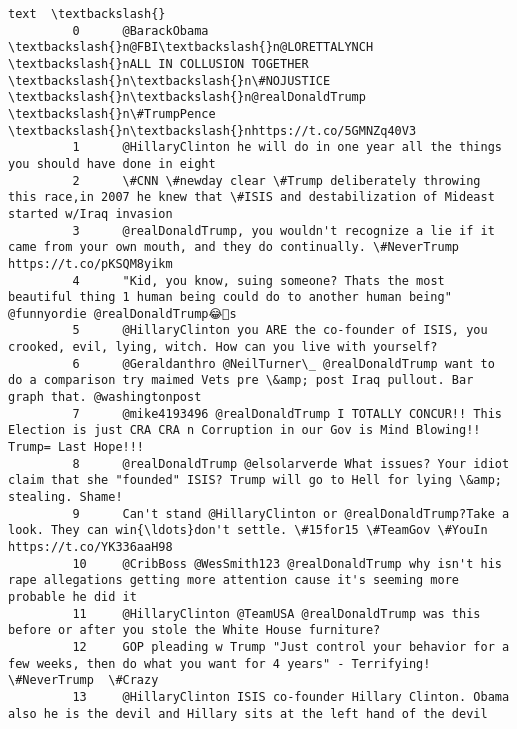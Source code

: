 \documentclass[11pt]{article}
\begin{document}
\begin{Verbatim}[commandchars=\\\{\}]
                                                                                                                                                                    text  \textbackslash{}
         0      @BarackObama \textbackslash{}n@FBI\textbackslash{}n@LORETTALYNCH \textbackslash{}nALL IN COLLUSION TOGETHER \textbackslash{}n\textbackslash{}n\#NOJUSTICE \textbackslash{}n\textbackslash{}n@realDonaldTrump \textbackslash{}n\#TrumpPence \textbackslash{}n\textbackslash{}nhttps://t.co/5GMNZq40V3               
         1      @HillaryClinton he will do in one year all the things you should have done in eight                                                                        
         2      \#CNN \#newday clear \#Trump deliberately throwing this race,in 2007 he knew that \#ISIS and destabilization of Mideast started w/Iraq invasion                
         3      @realDonaldTrump, you wouldn't recognize a lie if it came from your own mouth, and they do continually. \#NeverTrump https://t.co/pKSQM8yikm                
         4      "Kid, you know, suing someone? Thats the most beautiful thing 1 human being could do to another human being" @funnyordie @realDonaldTrump😂💩s               
         5      @HillaryClinton you ARE the co-founder of ISIS, you crooked, evil, lying, witch. How can you live with yourself?                                           
         6      @Geraldanthro @NeilTurner\_ @realDonaldTrump want to do a comparison try maimed Vets pre \&amp; post Iraq pullout. Bar graph that. @washingtonpost           
         7      @mike4193496 @realDonaldTrump I TOTALLY CONCUR!! This Election is just CRA CRA n Corruption in our Gov is Mind Blowing!! Trump= Last Hope!!!               
         8      @realDonaldTrump @elsolarverde What issues? Your idiot claim that she "founded" ISIS? Trump will go to Hell for lying \&amp; stealing. Shame!               
         9      Can't stand @HillaryClinton or @realDonaldTrump?Take a look. They can win{\ldots}don't settle. \#15for15 \#TeamGov \#YouIn  https://t.co/YK336aaH98                
         10     @CribBoss @WesSmith123 @realDonaldTrump why isn't his rape allegations getting more attention cause it's seeming more probable he did it                   
         11     @HillaryClinton @TeamUSA @realDonaldTrump was this before or after you stole the White House furniture?                                                    
         12     GOP pleading w Trump "Just control your behavior for a few weeks, then do what you want for 4 years" - Terrifying! \#NeverTrump  \#Crazy                     
         13     @HillaryClinton ISIS co-founder Hillary Clinton. Obama also he is the devil and Hillary sits at the left hand of the devil                                 

\end{Verbatim}
\end{document}
